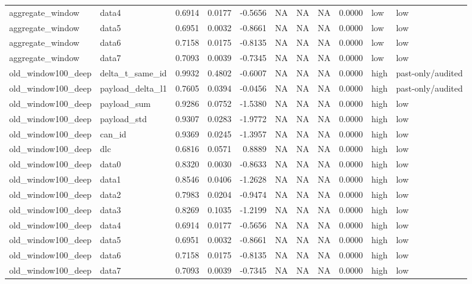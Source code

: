 \begin{tabular}{llrrrrrrrll}
aggregate\_window & data4 & 0.6914 & 0.0177 & -0.5656 & NA & NA & NA & 0.0000 & low & low \\
aggregate\_window & data5 & 0.6951 & 0.0032 & -0.8661 & NA & NA & NA & 0.0000 & low & low \\
aggregate\_window & data6 & 0.7158 & 0.0175 & -0.8135 & NA & NA & NA & 0.0000 & low & low \\
aggregate\_window & data7 & 0.7093 & 0.0039 & -0.7345 & NA & NA & NA & 0.0000 & low & low \\
old\_window100\_deep & delta\_t\_same\_id & 0.9932 & 0.4802 & -0.6007 & NA & NA & NA & 0.0000 & high & past-only/audited \\
old\_window100\_deep & payload\_delta\_l1 & 0.7605 & 0.0394 & -0.0456 & NA & NA & NA & 0.0000 & high & past-only/audited \\
old\_window100\_deep & payload\_sum & 0.9286 & 0.0752 & -1.5380 & NA & NA & NA & 0.0000 & high & low \\
old\_window100\_deep & payload\_std & 0.9307 & 0.0283 & -1.9772 & NA & NA & NA & 0.0000 & high & low \\
old\_window100\_deep & can\_id & 0.9369 & 0.0245 & -1.3957 & NA & NA & NA & 0.0000 & high & low \\
old\_window100\_deep & dlc & 0.6816 & 0.0571 & 0.8889 & NA & NA & NA & 0.0000 & high & low \\
old\_window100\_deep & data0 & 0.8320 & 0.0030 & -0.8633 & NA & NA & NA & 0.0000 & high & low \\
old\_window100\_deep & data1 & 0.8546 & 0.0406 & -1.2628 & NA & NA & NA & 0.0000 & high & low \\
old\_window100\_deep & data2 & 0.7983 & 0.0204 & -0.9474 & NA & NA & NA & 0.0000 & high & low \\
old\_window100\_deep & data3 & 0.8269 & 0.1035 & -1.2199 & NA & NA & NA & 0.0000 & high & low \\
old\_window100\_deep & data4 & 0.6914 & 0.0177 & -0.5656 & NA & NA & NA & 0.0000 & high & low \\
old\_window100\_deep & data5 & 0.6951 & 0.0032 & -0.8661 & NA & NA & NA & 0.0000 & high & low \\
old\_window100\_deep & data6 & 0.7158 & 0.0175 & -0.8135 & NA & NA & NA & 0.0000 & high & low \\
old\_window100\_deep & data7 & 0.7093 & 0.0039 & -0.7345 & NA & NA & NA & 0.0000 & high & low \\
\bottomrule
\end{tabular}
